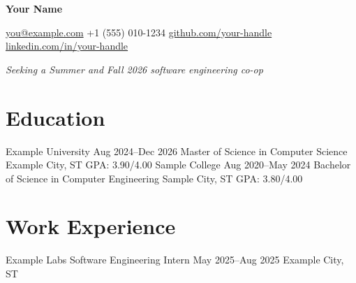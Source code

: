 \documentclass[letterpaper,10pt]{article}
\begin{document}
\begin{center}
{\fontsize{18}{21}\selectfont\bfseries Your Name\par}
\vspace{4pt}
\small
\href{mailto:you@example.com}{you@example.com}
\quad\textbar\quad +1 (555) 010-1234
\quad\textbar\quad \href{https://github.com/your-handle}{github.com/your-handle}
\quad\textbar\quad \href{https://www.linkedin.com/in/your-handle}{linkedin.com/in/your-handle}
\par\vspace{2pt}
\textit{Seeking a Summer and Fall 2026 software engineering co-op}
\end{center}

\section{Education}
\begin{resumeList}
\resumeEducation
  {Example University}
  {Aug 2024--Dec 2026}
  {Master of Science in Computer Science}
  {Example City, ST}
  {GPA: 3.90/4.00}
\resumeEducation
  {Sample College}
  {Aug 2020--May 2024}
  {Bachelor of Science in Computer Engineering}
  {Sample City, ST}
  {GPA: 3.80/4.00}
\end{resumeList}
\vspace{-8pt}

\section{Work Experience}
\begin{resumeList}
\resumeHeading
  {Example Labs}
  {Software Engineering Intern}
  {May 2025--Aug 2025}
  {Example City, ST}
\begin{resumeBullets}
\end{resumeBullets}
\end{resumeList}
\vspace{-2pt}
\end{document}
